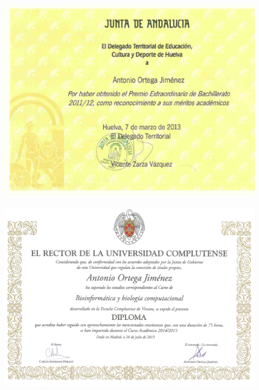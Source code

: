 %


\hypertarget{premio_extraordinario}{}
\begin{landscape}
\centering
\includegraphics[scale=0.9]{./premio_extraordinario.pdf}
\end{landscape}
\restoregeometry
\clearpage


\thispagestyle{empty}

\hypertarget{complu}{}
\begin{landscape}
\centering
\includegraphics[scale=0.2]{./bioinformatica2.jpg}
\end{landscape}
\restoregeometry
\clearpage


